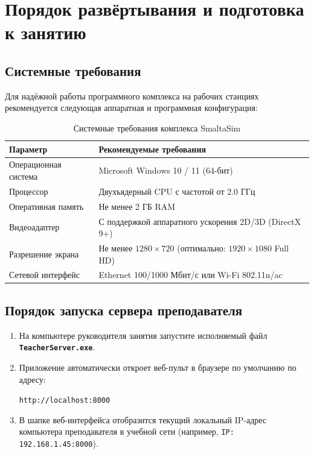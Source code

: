 \documentclass[12pt,a4paper]{report}
\begin{document}
\chapter{Порядок развёртывания и подготовка к занятию}

\section{Системные требования}
Для надёжной работы программного комплекса на рабочих станциях рекомендуется следующая аппаратная и программная конфигурация:
\begin{table}[H]
    \centering
    \begin{tabularx}{\textwidth}{lX}
        \toprule
        \textbf{Параметр} & \textbf{Рекомендуемые требования} \\
        \midrule
        Операционная система & Microsoft Windows 10 / 11 (64-бит) \\
        Процессор & Двухъядерный CPU с частотой от 2.0 ГГц \\
        Оперативная память & Не менее 2 ГБ RAM \\
        Видеоадаптер & С поддержкой аппаратного ускорения 2D/3D (DirectX 9+) \\
        Разрешение экрана & Не менее $1280 \times 720$ (оптимально: $1920 \times 1080$ Full HD) \\
        Сетевой интерфейс & Ethernet 100/1000 Мбит/с или Wi-Fi 802.11n/ac \\
        \bottomrule
    \end{tabularx}
    \caption{Системные требования комплекса SmaltaSim}
\end{table}

\section{Порядок запуска сервера преподавателя}
\begin{enumerate}
    \item На компьютере руководителя занятия запустите исполняемый файл \textbf{\texttt{TeacherServer.exe}}.
    \item Приложение автоматически откроет веб-пульт в браузере по умолчанию по адресу:
    \begin{center}
        \texttt{http://localhost:8000}
    \end{center}
    \item В шапке веб-интерфейса отобразится текущий локальный IP-адрес компьютера преподавателя в учебной сети (например, \texttt{IP: 192.168.1.45:8000}).
\end{enumerate}
\end{document}
